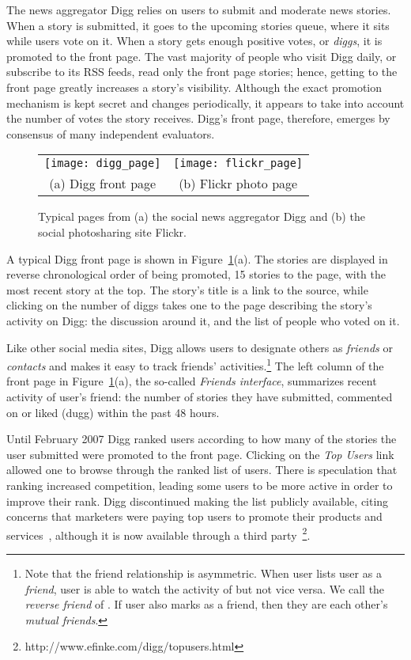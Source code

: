 \documentclass[]{article}
\newcommand{\figref}[1]{Figure~\ref{#1}}
\begin{document}
The news aggregator Digg relies on users to submit
 and moderate news stories. When a story is submitted, it goes to the
upcoming stories queue, where it sits while users vote on it.
When a story gets enough positive votes, or \emph{diggs}, it is promoted to the front page.
The vast majority  of people who visit Digg daily, or subscribe to
its RSS feeds, read only the front page stories; hence, getting to
the front page greatly increases a story's visibility. Although
the exact promotion mechanism is kept secret and changes
periodically, it appears to take into account the number of votes
the story receives. Digg's  front page, therefore, emerges by
consensus of many independent evaluators.


\begin{figure}
\begin{tabular}{cc}
\texttt{[image: digg\_page]} &
\texttt{[image: flickr\_page]} \\
(a) Digg front page & (b) Flickr photo page
\end{tabular}
\caption {Typical pages from (a) the social news aggregator Digg and
(b) the social photosharing site Flickr.
 } \label{fig:pages}
\end{figure}


A typical Digg front page is shown in \figref{fig:pages}(a).
The stories are displayed in reverse chronological order of being
promoted, 15 stories to the page, with the most recent story at the
top. The story's title is a link to the source, while clicking on
the number of diggs takes one to the page describing the story's
activity on Digg: the discussion around it, and the list of people who
voted on it.

Like other social media sites, Digg allows users to designate others
as \emph{friends} or \emph{contacts} and makes it easy
to track friends' activities.\footnote{Note
that the friend relationship is asymmetric. When user  lists user
 as a \emph{friend}, user  is able to watch the activity of
 but not vice versa. We call  the \emph{reverse friend} of
. If user  also marks  as a friend, then they are each other's
\emph{mutual friends}.} The left column of the front page in
\figref{fig:pages}(a), the so-called \emph{Friends interface}, summarizes
recent activity of user's friend: the number of stories they have
submitted, commented on or liked (dugg) within the past 48 hours.

Until February 2007 Digg ranked users
according to how many of the stories the user submitted were
promoted to the front page.  Clicking on the \emph{Top
Users} link allowed one to browse through the ranked list of users.
There is speculation that ranking increased competition,
leading some users to be more active in order to improve their
rank.  Digg discontinued making the list publicly
available, citing concerns that marketers were paying top users to
promote their products and services~\cite{WSJ}, although it is now
available through a third party~\footnote{http://www.efinke.com/digg/topusers.html}.
\end{document}
